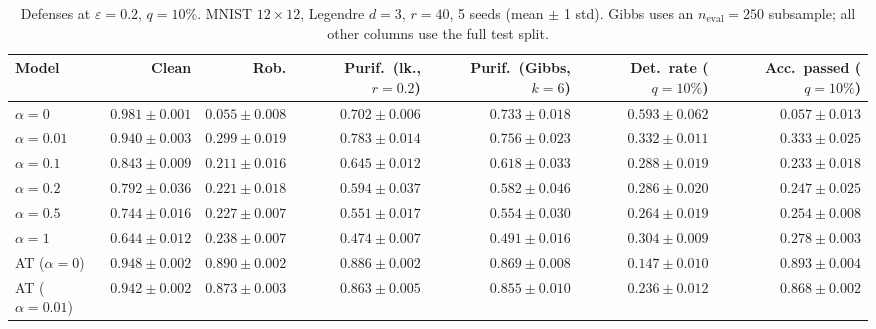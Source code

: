 \begin{table}[htbp]
  \centering
  \small
  \begin{tabular}{@{}lrrrrrr@{}}
    \toprule
    Model & Clean & Rob. & Purif.\ (lk., $r{=}0.2$) & Purif.\ (Gibbs, $k{=}6$) & Det.\ rate ($q{=}10\%$) & Acc.\ passed ($q{=}10\%$) \\
    \midrule
    $\alpha{=}0$ & $\mathbf{0.981 \pm 0.001}$ & $0.055 \pm 0.008$ & $0.702 \pm 0.006$ & $0.733 \pm 0.018$ & $\mathbf{0.593 \pm 0.062}$ & $0.057 \pm 0.013$ \\
    $\alpha{=}0.01$ & $0.940 \pm 0.003$ & $0.299 \pm 0.019$ & $0.783 \pm 0.014$ & $0.756 \pm 0.023$ & $0.332 \pm 0.011$ & $0.333 \pm 0.025$ \\
    $\alpha{=}0.1$ & $0.843 \pm 0.009$ & $0.211 \pm 0.016$ & $0.645 \pm 0.012$ & $0.618 \pm 0.033$ & $0.288 \pm 0.019$ & $0.233 \pm 0.018$ \\
    $\alpha{=}0.2$ & $0.792 \pm 0.036$ & $0.221 \pm 0.018$ & $0.594 \pm 0.037$ & $0.582 \pm 0.046$ & $0.286 \pm 0.020$ & $0.247 \pm 0.025$ \\
    $\alpha{=}0.5$ & $0.744 \pm 0.016$ & $0.227 \pm 0.007$ & $0.551 \pm 0.017$ & $0.554 \pm 0.030$ & $0.264 \pm 0.019$ & $0.254 \pm 0.008$ \\
    $\alpha{=}1$ & $0.644 \pm 0.012$ & $0.238 \pm 0.007$ & $0.474 \pm 0.007$ & $0.491 \pm 0.016$ & $0.304 \pm 0.009$ & $0.278 \pm 0.003$ \\
    AT ($\alpha{=}0$) & $0.948 \pm 0.002$ & $\mathbf{0.890 \pm 0.002}$ & $\mathbf{0.886 \pm 0.002}$ & $\mathbf{0.869 \pm 0.008}$ & $0.147 \pm 0.010$ & $\mathbf{0.893 \pm 0.004}$ \\
    AT ($\alpha{=}0.01$) & $0.942 \pm 0.002$ & $0.873 \pm 0.003$ & $0.863 \pm 0.005$ & $0.855 \pm 0.010$ & $0.236 \pm 0.012$ & $0.868 \pm 0.002$ \\
    \bottomrule
  \end{tabular}
  \caption{Defenses at $\varepsilon=0.2$, $q{=}10\%$. MNIST $12\times12$, Legendre $d{=}3$, $r{=}40$, 5 seeds (mean $\pm$ 1 std). Gibbs uses an $n_{\mathrm{eval}}=250$ subsample; all other columns use the full test split.}
  \label{tab:mnist_r12_models_r40_eps0.2}
\end{table}
